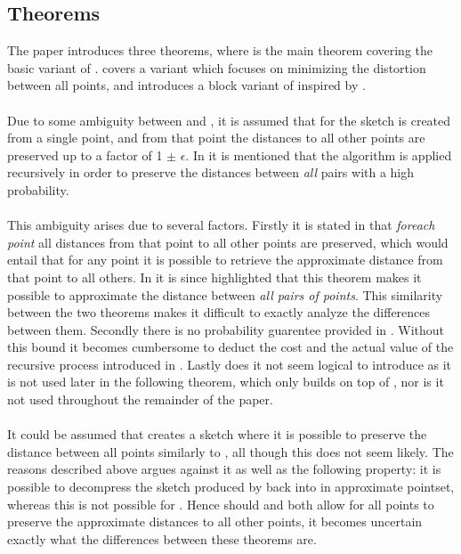 \subsection{Theorems}
The paper introduces three theorems, where  is the main theorem covering the basic variant of \qs{}.  covers a variant which focuses on minimizing the distortion between all points, and  introduces a block variant of  inspired by \cite{schmid9}.
\\
\\
Due to some ambiguity between  and , it is assumed that for  the sketch is created from a single point, and from that point the distances to all other points are preserved up to a factor of 1 $\pm$ $\epsilon$. In  it is mentioned that the algorithm is applied recursively in order to preserve the distances between \textit{all} pairs with a high probability.
\\
\\
This ambiguity arises due to several factors. Firstly it is stated in  that \textit{foreach point} all distances from that point to all other points are preserved, which would entail that for any point it is possible to retrieve the approximate distance from that point to all others. In  it is since highlighted that this theorem makes it possible to approximate the distance between \textit{all pairs of points}. This similarity between the two theorems makes it difficult to exactly analyze the differences between them. Secondly there is no probability guarentee provided in . Without this bound it becomes cumbersome to deduct the cost and the actual value of the recursive process introduced in . Lastly does it not seem logical to introduce  as it is not used later in the following theorem, which only builds on top of , nor is it not used throughout the remainder of the paper. 
\\
\\
It could be assumed that  creates a sketch where it is possible to preserve the distance between all points similarly to , all though this does not seem likely. The reasons described above argues against it as well as the following property: it is possible to decompress the sketch produced by  back into in approximate pointset, whereas this is not possible for . Hence should  and  both allow for all points to preserve the approximate distances to all other points, it becomes uncertain exactly what the differences between these theorems are. 
